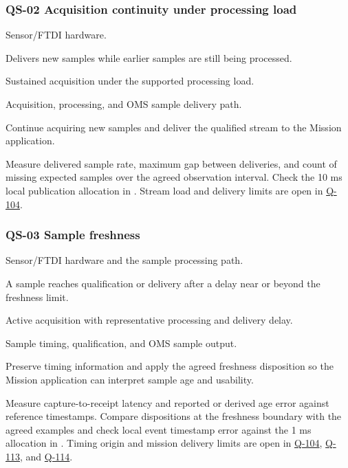 \subsubsection{QS-02 Acquisition continuity under processing load}
\label{Scenario:QS-02}
\begin{description}[leftmargin=0pt,labelindent=0pt,labelsep=0pt,style=nextline]
\item[Stimulus source] Sensor/FTDI hardware.
\item[Stimulus] Delivers new samples while earlier samples are still being processed.
\item[Environment] Sustained acquisition under the supported processing load.
\item[Artifact] Acquisition, processing, and OMS sample delivery path.
\item[Response] Continue acquiring new samples and deliver the qualified stream to the Mission application.
\item[Response measure] Measure delivered sample rate, maximum gap between deliveries, and count of missing expected samples over the agreed observation interval. Check the 10 ms local publication allocation in . Stream load and delivery limits are open in \hyperref[Question:Q-104]{Q-104}.
\end{description}

\subsubsection{QS-03 Sample freshness}
\label{Scenario:QS-03}
\begin{description}[leftmargin=0pt,labelindent=0pt,labelsep=0pt,style=nextline]
\item[Stimulus source] Sensor/FTDI hardware and the sample processing path.
\item[Stimulus] A sample reaches qualification or delivery after a delay near or beyond the freshness limit.
\item[Environment] Active acquisition with representative processing and delivery delay.
\item[Artifact] Sample timing, qualification, and OMS sample output.
\item[Response] Preserve timing information and apply the agreed freshness disposition so the Mission application can interpret sample age and usability.
\item[Response measure] Measure capture-to-receipt latency and reported or derived age error against reference timestamps. Compare dispositions at the freshness boundary with the agreed examples and check local event timestamp error against the 1 ms allocation in . Timing origin and mission delivery limits are open in \hyperref[Question:Q-104]{Q-104}, \hyperref[Question:Q-113]{Q-113}, and \hyperref[Question:Q-114]{Q-114}.
\end{description}

